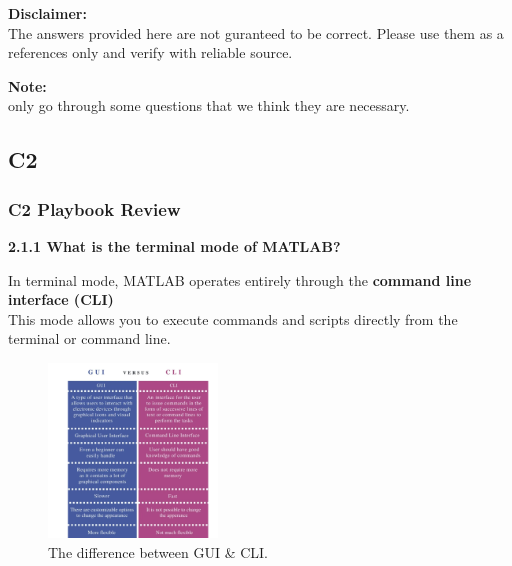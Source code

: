 \documentclass[
	11pt, %
]{beamer}
\begin{document}
\begin{frame}
	\textbf{Disclaimer:}\\
    The answers provided here are not guranteed to be correct. Please
    use them as a references only and verify with reliable source.

    \smallskip

    \textbf{Note:}\\
     only go through some questions that we think they are necessary.
	
\end{frame}

\subsection{C2}


\begin{frame}
	\frametitle{C2 Playbook Review}
	\textbf{2.1.1 What is the terminal mode of MATLAB?}
	\bigskip %
	
    \quad In terminal mode, MATLAB operates entirely through the \textbf{command line interface (CLI)} \\
	\quad This mode allows you to execute commands and scripts directly from the terminal or command line.
    \begin{figure}
        \centering
        \includegraphics[width=0.4\textwidth]{diff_gui_and_cli.png}
        \caption{The difference between GUI \& CLI.}
    \end{figure}
\end{frame}

\end{document}
